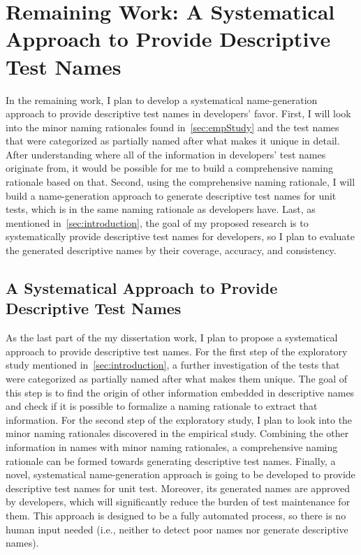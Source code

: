 \section{Remaining Work: A Systematical Approach to Provide Descriptive Test Names}
\label{sec:remaining-work}

In the remaining work, I plan to develop a systematical name-generation approach to provide descriptive test names in developers' favor.
%
First, I will look into the minor naming rationales found in~\cref{sec:empStudy} and the test names that were categorized as partially named after what makes it unique in detail.
%
After understanding where all of the information in developers' test names originate from, it would be possible for me to build a comprehensive naming rationale based on that.
%
Second, using the comprehensive naming rationale, I will build a name-generation approach to generate descriptive test names for unit tests, which is in the same naming rationale as developers have.
%
Last, as mentioned in~\cref{sec:introduction}, the goal of my proposed research is to systematically provide descriptive test names for developers, so I plan to evaluate the generated descriptive names by their coverage, accuracy, and consistency.


\subsection{A Systematical Approach to Provide Descriptive Test Names}

As the last part of the my dissertation work, I plan to propose a systematical approach to provide descriptive test names.
%
For the first step of the exploratory study mentioned in~\cref{sec:introduction}, a further investigation of the tests that were categorized as partially named after what makes them unique.
%
The goal of this step is to find the origin of other information embedded in descriptive names and check if it is possible to formalize a naming rationale to extract that information.
%
For the second step of the exploratory study, I plan to look into the minor naming rationales discovered in the empirical study.
%
Combining the other information in names with minor naming rationales, a comprehensive naming rationale can be formed towards generating descriptive test names.
%
Finally, a novel, systematical name-generation approach is going to be developed to provide descriptive test names for unit test.
%
Moreover, its generated names are approved by developers, which will significantly reduce the burden of test maintenance for them.
%
This approach is designed to be a fully automated process, so there is no human input needed (i.e., neither to detect poor names nor generate descriptive names).


